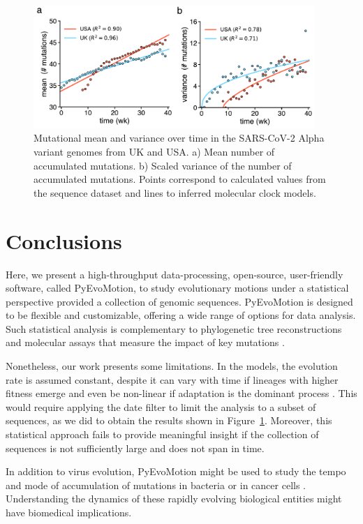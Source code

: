 \begin{figure}[!h]%
    \centering
    \includegraphics[width=0.95\textwidth]{assets/Ch3Fig2_horz.pdf}
    \caption{Mutational mean and variance over time in the SARS-CoV-2 Alpha variant genomes from UK and USA. a) Mean number of accumulated mutations. b) Scaled variance of the number of accumulated mutations. Points correspond to calculated values from the sequence dataset and lines to inferred molecular clock models.}\label{fig2:simulation_results}
\end{figure}


\section{Conclusions}

Here, we present a high-throughput data-processing, open-source, user-friendly software, called PyEvoMotion, to study evolutionary motions under a statistical perspective provided a collection of genomic sequences. PyEvoMotion is designed to be flexible and customizable, offering a wide range of options for data analysis. Such statistical analysis is complementary to phylogenetic tree reconstructions and molecular assays that measure the impact of key mutations \cite{Mlcochova2021}. 

Nonetheless, our work presents some limitations. In the models, the evolution rate is assumed constant, despite it can vary with time if lineages with higher fitness emerge and even be non-linear if adaptation is the dominant process \cite{tenaillon2016}. This would require applying the date filter to limit the analysis to a subset of sequences, as we did to obtain the results shown in Figure~\ref{fig2:simulation_results}. Moreover, this statistical approach fails to provide meaningful insight if the collection of sequences is not sufficiently large and does not span in time.

In addition to virus evolution, PyEvoMotion might be used to study the tempo and mode of accumulation of mutations in bacteria \cite{tenaillon2016} or in cancer cells \cite{borgsmuller2023}. Understanding the dynamics of these rapidly evolving biological entities might have biomedical implications.

